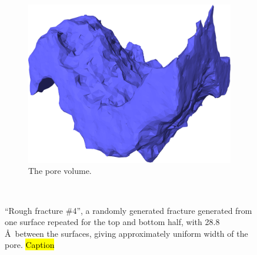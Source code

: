 \begin{figure}[!p]
\begin{subfigure}[t]{\myfigwidth}
        \includegraphics[width=\textwidth]{images/systems/trimmed-rough_fracture05_09}%
        \caption{The pore volume.}%
    \end{subfigure}%
    \vspace{10pt}\\%
    \caption{%
        ``Rough fracture \#4'', a randomly generated fracture generated from one surface repeated for the top and bottom half, with 28.8 \AA\ between the surfaces, giving approximately uniform width of the pore. \hl{Caption} %
        \label{fig:renderings_rough_fracture05}%
    }%
\end{figure}%

